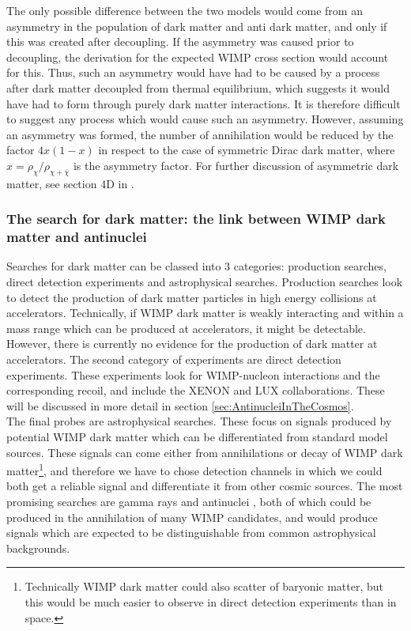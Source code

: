 The only possible difference between the two models would come from an asymmetry in the population of dark matter and anti dark matter, and only if this was created after decoupling. If the asymmetry was caused prior to decoupling, the derivation for the expected WIMP cross section would account for this. Thus, such an asymmetry would have had to be caused by a process after dark matter decoupled from thermal equilibrium, which suggests it would have had to form through purely dark matter interactions. It is therefore difficult to suggest any process which would cause such an asymmetry. However, assuming an asymmetry was formed, the number of annihilation would be reduced by the factor $4x(1-x)$ in respect to the case of symmetric Dirac dark matter, where $x = \rho_\chi / \rho_{\chi + \overline{\chi}}$ is the asymmetry factor. For further discussion of asymmetric dark matter, see section 4D in \cite{BAER20151}. 

\subsubsection{The search for dark matter: the link between WIMP dark matter and antinuclei}
Searches for dark matter can be classed into 3 categories: production searches, direct detection experiments and astrophysical searches. Production searches look to detect the production of dark matter particles in high energy collisions at accelerators. Technically, if WIMP dark matter is weakly interacting and within a mass range which can be produced at accelerators, it might be detectable. However, there is currently no evidence for the production of dark matter at accelerators. The second category of experiments are direct detection experiments. These experiments look for WIMP-nucleon interactions and the corresponding recoil, and include the XENON \cite{XENON_new_physics, XENON2} and LUX collaborations\cite{Lux}. These will be discussed in more detail in section \ref{sec:AntinucleiInTheCosmos}.\\

The final probes are astrophysical searches. These focus on signals produced by potential WIMP dark matter which can be differentiated from standard model sources. These signals can come either from annihilations or decay of WIMP dark matter\footnote{Technically WIMP dark matter could also scatter of baryonic matter, but this would be much easier to observe in direct detection experiments than in space.}, and therefore we have to chose detection channels in which we could both get a reliable signal and differentiate it from other cosmic sources. The most promising searches are gamma rays and antinuclei \cite{Conrad2017}, both of which could be produced in the annihilation of many WIMP candidates, and would produce signals which are expected to be distinguishable from common astrophysical backgrounds. 


%